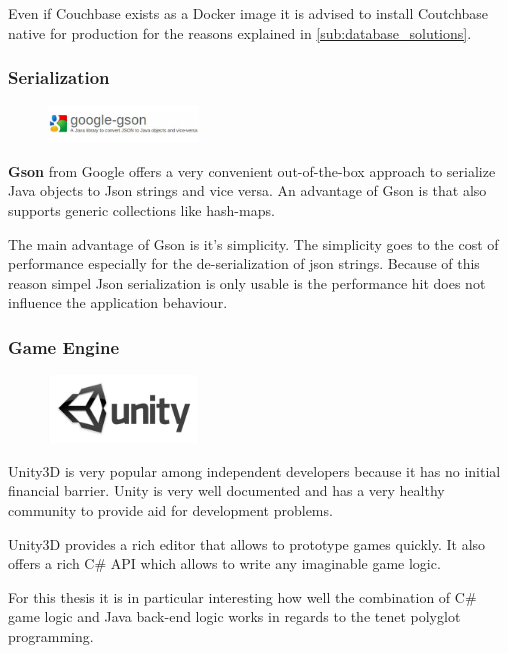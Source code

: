 Even if Couchbase exists as a Docker image it is advised to install
Coutchbase native for production for the reasons explained in
\autoref{sub:database_solutions}.
    
\subsubsection{Serialization}

\begin{figure}
    \includegraphics[width=4cm]{images/dependencies/google-gson}
\end{figure}

\textbf{Gson} from Google offers a very convenient out-of-the-box approach to
serialize Java objects to Json strings and vice versa. An advantage of Gson is that
also supports generic collections like hash-maps.

The main advantage of Gson is it's simplicity. The simplicity goes to the
cost of performance especially for the de-serialization of json strings.
Because of this reason simpel Json serialization is only usable is the
performance hit does not influence the application behaviour.

\subsubsection{Game Engine}

\begin{figure}
    \includegraphics[width=4cm]{images/dependencies/Unity3D}
\end{figure}
    
Unity3D is very popular among independent developers because it has no
initial financial barrier. Unity is very well documented and has a very
healthy community to provide aid for development problems.

Unity3D provides a rich editor that allows to prototype games quickly. It
also offers a rich C\# API which allows to write any imaginable game logic. 

For this thesis it is in particular interesting how well the combination of
C\# game logic and Java back-end logic works in regards to the \ms{} tenet
polyglot programming.
    



